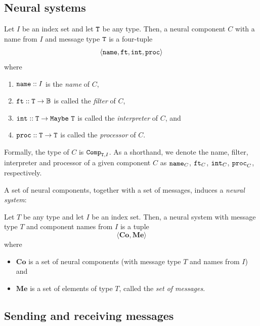 \subsection{Neural systems}\label{sec:mathematicalNeuralSystem}

\begin{definition}
	Let $I$ be an index set and let $\mathtt{T}$ be any type. Then, a neural component $C$ with a name from $I$ and message type $\mathtt{T}$ is a four-tuple
	$$
		\langle \mathtt{name}, \mathtt{ft}, \mathtt{int}, \mathtt{proc} \rangle
	$$
	where
	\begin{enumerate}
		\item $\mathtt{name} :: I$ is the {\em name} of $C$,
		\item $\mathtt{ft} :: \mathtt{T \rightarrow \mathbb{B}}$ is  called the {\em filter} of $C$,
		\item $\mathtt{int} :: \mathtt{T} \rightarrow \mathtt{Maybe\ T}$ is called the {\em interpreter} of $C$, and
		\item $\mathtt{proc} :: \mathtt{T} \rightarrow \mathtt{T}$ is called the {\em processor} of $C$.
	\end{enumerate}
	
	Formally, the type of $C$ is $\mathtt{Comp}_{\mathtt{T},I}$. As a shorthand, we denote the name, filter, interpreter and processor of a given component $C$ as $\mathtt{name}_C$, $\mathtt{ft}_C$, $\mathtt{int}_C$, $\mathtt{proc}_C$, respectively.
\end{definition}

\noindent
A set of neural components, together with a set of messages, induces a {\em neural system}:

\begin{definition}
	Let $T$ be any type and let $I$ be an index set. Then, a neural system with message type $T$ and component names from $I$ is a tuple
	$$
		\langle \textbf{Co}, \textbf{Me} \rangle
	$$
	where
	\begin{itemize}
		\item $\textbf{Co}$ is a set of neural components (with message type $T$ and names from $I$) and
		\item $\textbf{Me}$ is a set of elements of type $T$, called the {\em set of messages}.
	\end{itemize}
\end{definition}

\subsection{Sending and receiving messages}\label{sec:notation}

